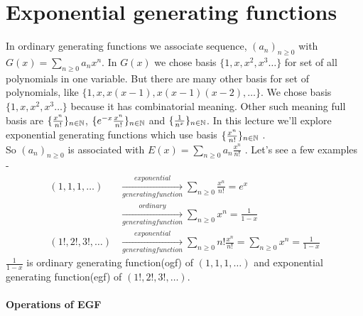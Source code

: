 \section{Exponential generating functions}
In ordinary generating functions we associate sequence, ${(a_n)}_{n \geq 0}$ with $G(x) = \sum_{n \geq 0} a_n x^n$. In $G(x)$ we chose basis $\{ 1, x, x^2, x^3 \dots\}$ for set of all polynomials in one variable. But there are many other basis for set of polynomials, like $\{1, x, x(x-1), x(x-1)(x-2), \dots\}$. We chose basis $\{ 1, x, x^2, x^3 \dots\}$ because it has combinatorial meaning. Other such meaning full basis are $\{\frac{x^n}{n!}\}_{n \in \mathbb{N}}$, $\{e^{-x} \frac{x^n}{n!}\}_{n \in \mathbb{N}}$ and $\{\frac{1}{n^x}\}_{n \in \mathbb{N}}$. In this lecture we'll explore exponential generating functions which use basis $\{\frac{x^n}{n!}\}_{n \in \mathbb{N}}$ . \\
So  ${(a_n)}_{n \geq 0}$ is associated with $E(x) = \sum_{n \geq 0} a_n \frac{x^n}{n!}$ . Let's see a few examples - 
\begin{align*}
(1, 1, 1, \dots ) &\xrightarrow[generating function]{exponential} \sum_{n \geq 0} \frac{x^n}{n!} = e^x    \\
&\xrightarrow[generating function]{ordinary} \sum_{n \geq 0} x^n = \frac{1}{1-x} \\
(1!, 2!, 3!, \dots) &\xrightarrow[generating function]{exponential} \sum_{n \geq 0} n! \frac{x^n}{n!} = \sum_{n \geq 0} x^n = \frac{1}{1-x}
\end{align*}
$\frac{1}{1-x}$ is ordinary generating function(ogf) of $(1, 1, 1, \dots )$ and exponential generating function(egf) of $(1!, 2!, 3!, \dots )$.\\
\\
\textbf{\Large {Operations of EGF}}
